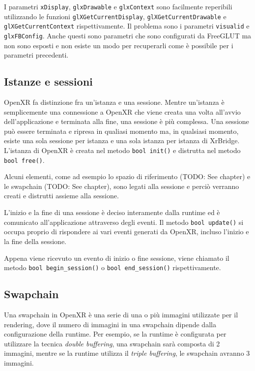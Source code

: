 \documentclass[twoside]{supsistudent}
\begin{document}
I parametri \texttt{xDisplay}, \texttt{glxDrawable} e \texttt{glxContext} sono facilmente reperibili utilizzando le funzioni \texttt{glXGetCurrentDisplay}, \texttt{glXGetCurrentDrawable} e \texttt{glXGetCurrentContext} rispettivamente. Il problema sono i parametri \texttt{visualid} e \texttt{glxFBConfig}. Anche questi sono parametri che sono configurati da FreeGLUT ma non sono esposti e non esiste un modo per recuperarli come è possibile per i parametri precedenti.

\subsection{Istanze e sessioni}

OpenXR fa distinzione fra un'istanza e una sessione. Mentre un'istanza è semplicemente una connessione a OpenXR che viene creata una volta all'avvio dell'applicazione e terminata alla fine, una sessione è più complessa. Una sessione può essere terminata e ripresa in qualiasi momento ma, in qualsiasi momento, esiste una sola sessione per istanza e una sola istanza per istanza di XrBridge. L'istanza di OpenXR è creata nel metodo \texttt{bool init()} e distrutta nel metodo \texttt{bool free()}.

Alcuni elementi, come ad esempio lo spazio di riferimento (TODO: See chapter) e le swapchain (TODO: See chapter), sono legati alla sessione e perciò verranno creati e distrutti assieme alla sessione.

L'inizio e la fine di una sessione è deciso interamente dalla runtime ed è comunicato all'applicazione attraverso degli eventi. Il metodo \texttt{bool update()} si occupa proprio di rispondere ai vari eventi generati da OpenXR, incluso l'inizio e la fine della sessione.

Appena viene ricevuto un evento di inizio o fine sessione, viene chiamato il metodo \texttt{bool begin\_session()} o \texttt{bool end\_session()} rispettivamente.

\subsection{Swapchain}

Una swapchain in OpenXR è una serie di una o più immagini utilizzate per il rendering, dove il numero di immagini in una swapchain dipende dalla configurazione della runtime. Per esempio, se la runtime è configurata per utilizzare la tecnica \textit{double buffering}, una swapchain sarà composta di 2 immagini, mentre se la runtime utilizza il \textit{triple buffering}, le swapchain avranno 3 immagini.
\end{document}
